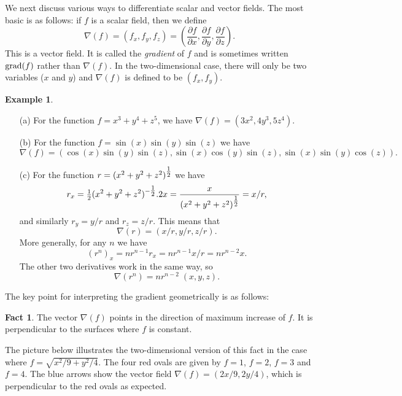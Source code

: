 \documentclass[reqno]{amsart}
\theoremstyle{definition}
\newtheorem{example}[theorem]{Example}
\newtheorem{fact}[theorem]{Fact}
\begin{document}
We next discuss various ways to differentiate scalar and vector
fields.  The most basic is as follows: if $f$ is a scalar
field, then we define
\[ \nabla(f) = (f_x,f_y,f_z) =
    \left(\frac{\partial f}{\partial x},
          \frac{\partial f}{\partial y},
          \frac{\partial f}{\partial z}\right).
\] 
This is a vector field.  It is called the \emph{gradient} of $f$ and
is sometimes written $\operatorname{grad}(f)$ rather than $\nabla(f)$.  In the
two-dimensional case, there will only be two variables ($x$ and $y$)
and $\nabla(f)$ is defined to be $(f_x,f_y)$.

\begin{example}\label{eg-grad}\ \\
 \begin{itemize}
  \item[(a)] For the function $f=x^3+y^4+z^5$, we have 
   $\nabla(f)=(3x^2,4y^3,5z^4)$.
  \item[(b)] For the function $f=\sin(x)\sin(y)\sin(z)$ we have 
   \[ \nabla(f)=(\cos(x)\sin(y)\sin(z),
                 \sin(x)\cos(y)\sin(z),
                 \sin(x)\sin(y)\cos(z)).
   \]
  \item[(c)] For the function $r=(x^2+y^2+z^2)^{\tfrac{1}{2}}$ we have 
   \[ r_x = \tfrac{1}{2}(x^2+y^2+z^2)^{-\tfrac{1}{2}}.2x =
       \frac{x}{(x^2+y^2+z^2)^{\tfrac{1}{2}}} = x/r,
   \]
   and similarly $r_y=y/r$ and $r_z=z/r$.  This means that
   \[ \nabla(r) = (x/r,y/r,z/r). \]
   More generally, for any $n$ we have 
   \[ (r^n)_x=nr^{n-1}r_x = nr^{n-1}x/r = nr^{n-2}x. \]
   The other two derivatives work in the same way, so 
   \[ \nabla(r^n) = nr^{n-2}\;(x,y,z). \]
 \end{itemize}
\end{example}

The key point for interpreting the gradient geometrically is as
follows:
\begin{fact}
 The vector $\nabla(f)$ points in the direction of maximum increase of
 $f$.  It is perpendicular to the surfaces where $f$ is constant.
\end{fact}

The picture below illustrates the two-dimensional version of this fact
in the case where $f=\sqrt{x^2/9+y^2/4}$.  The four red ovals are
given by $f=1$, $f=2$, $f=3$ and $f=4$.  The blue arrows show the
vector field $\nabla(f)=(2x/9,2y/4)$, which is perpendicular to the
red ovals as expected.
\begin{center}
\end{center}
\end{document}
